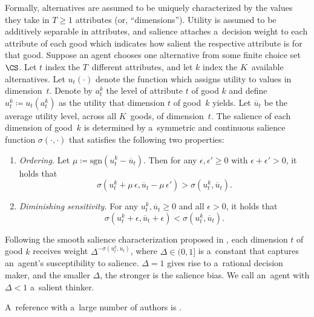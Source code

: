 Formally, alternatives are assumed to be uniquely characterized by the values they take in ${T \geq 1}$ attributes (or, ``dimensions''). Utility is assumed to be additively separable in attributes, and salience attaches a~decision weight to each attribute of each good which indicates how salient the respective attribute is for that good. Suppose an agent chooses one alternative from some finite choice set $\CS$. Let $t$ index the $T$~different attributes, and let $k$ index the $K$~available alternatives. Let $u_t(\cdot)$ denote the function which assigns utility to values in dimension~$t$.
Denote by $a^k_{t}$ the level of attribute $t$ of good $k$ and define ${u^k_t \coloneqq u_t(a^k_t)}$ as the utility that dimension $t$ of good~$k$ yields. Let $\overline{u}_t$ be the average utility level, across all $K$~goods, of dimension~$t$. The salience of each dimension of good~$k$ is determined by a~symmetric and continuous salience function ${\sigma(\cdot, \cdot)}$ that satisfies the following two properties:
\begin{enumerate}
\item \emph{Ordering.} Let ${\mu \coloneqq \mathrm{sgn}(u^k_t - \overline{u}_t)}$. Then for any ${\epsilon,\epsilon' \geq 0}$ with ${\epsilon + \epsilon' > 0}$, it holds that~
\begin{equation}
	\sigma(u^k_t + \mu\,\epsilon, \overline{u}_t - \mu\,\epsilon') > \sigma (u^k_t,\overline{u}_t).
\end{equation}
\item \emph{Diminishing sensitivity.} For any ${u^k_t, \overline{u}_t \geq 0}$ and all ${\epsilon > 0}$, it holds that
\begin{equation}
	\sigma(u^k_t + \epsilon, \overline{u}_t + \epsilon) < \sigma(u^k_t,\overline{u}_t).
\end{equation}
\end{enumerate}

Following the smooth salience characterization proposed in \cite[p.\,1255]{Bordalo2012}, each dimension $t$ of good $k$ receives weight $\Delta^{-\sigma(u^k_t, \overline{u}_t)}$, where ${\Delta \in (0, 1]}$ is a~constant that captures an~agent's susceptibility to salience. ${\Delta = 1}$ gives rise to a~rational decision maker, and the smaller $\Delta$, the stronger is the salience bias. We call an~agent with ${\Delta < 1}$ a~salient thinker.

A~reference with a~large number of authors is \cite{Henrich2005}.
